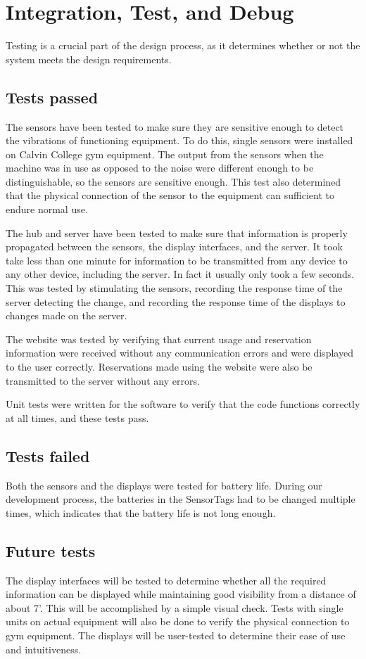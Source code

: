 \documentclass[PPFS.tex]{template/subfiles}
\begin{document}
\section{Integration, Test, and Debug}
Testing is a crucial part of the design process, as it determines whether or not the system meets the design requirements.

\subsection{Tests passed}
The sensors have been tested to make sure they are sensitive enough to detect the vibrations of functioning equipment.  To do this, single sensors were installed on Calvin College gym equipment. The output from the sensors when the machine was in use as opposed to the noise were different enough to be distinguishable, so the sensors are sensitive enough. This test also determined that the physical connection of the sensor to the equipment can sufficient to endure normal use.

The hub and server have been tested to make sure that information is properly propagated between the sensors, the display interfaces, and the server. It took take less than one minute for information to be transmitted from any device to any other device, including the server. In fact it usually only took a few seconds. This was tested by stimulating the sensors, recording the response time of the server detecting the change, and recording the response time of the displays to changes made on the server.

The website was tested by verifying that current usage and reservation information were received without any communication errors and were displayed to the user correctly. Reservations made using the website were also be transmitted to the server without any errors.

Unit tests were written for the software to verify that the code functions correctly at all times, and these tests pass.
\subsection{Tests failed}
Both the sensors and the displays were tested for battery life. During our development process, the batteries in the SensorTags had to be changed multiple times, which indicates that the battery life is not long enough.
\subsection{Future tests}
The display interfaces will be tested to determine whether all the required information can be displayed while maintaining good visibility from a distance of about 7'. This will be accomplished by a simple visual check. Tests with single units on actual equipment will also be done to verify the physical connection to gym equipment. The displays will be user-tested to determine their ease of use and intuitiveness.
\end{document}

